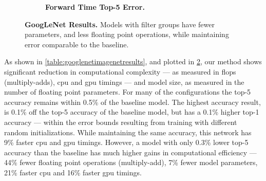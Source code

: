 \documentclass[thesis]{subfiles}
\begin{document}
\begin{figure}[p]
\begin{subfigure}[b]{\textwidth}
			\centering
			\caption{\textbf{ Forward Time \vs Top-5 Error.}}
			\label{fig:googlenet50cpuforward}
		\end{subfigure}
		
		\caption[GoogLeNet  results]{\textbf{GoogLeNet  Results.} Models with filter groups have fewer parameters, and less floating point operations, while maintaining error comparable to the baseline.}
		\label{fig:googlenet50plots}
	\end{figure}
	
	As shown in \cref{table:googlenetimagenetresults}, and plotted in \cref{fig:googlenet50plots}, our method shows significant reduction in computational complexity --- as measured in \gls{flops} (multiply-adds), \gls{cpu} and \gls{gpu} timings --- and model size, as measured in the number of floating point parameters. For many of the configurations the top-5 accuracy remains within 0.5\% of the baseline model. 
	The highest accuracy result, is 0.1\% off the top-5 accuracy of the baseline model, but has a 0.1\% higher top-1 accuracy --- within the error bounds resulting from training with different random initializations. While maintaining the same accuracy, this network has 9\% faster \gls{cpu} and \gls{gpu} timings. However, a model with only 0.3\% lower top-5 accuracy than the baseline has much higher gains in computational efficiency --- 44\% fewer floating point operations (multiply-add), 7\% fewer model parameters, 21\% faster \gls{cpu} and 16\% faster \gls{gpu} timings.
	
\end{document}
